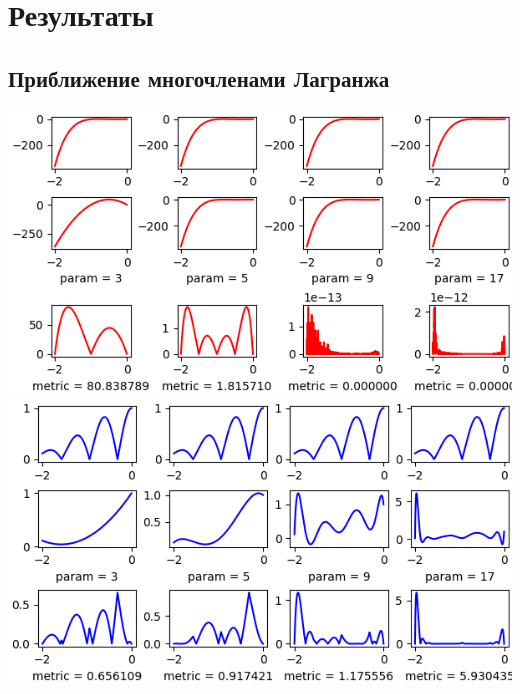 \documentclass{article}
\begin{document}
\section{Результаты}

\subsection{Приближение многочленами Лагранжа}
\includegraphics{Figure_12.png}
\includegraphics{Figure_13.png}
\end{document}
